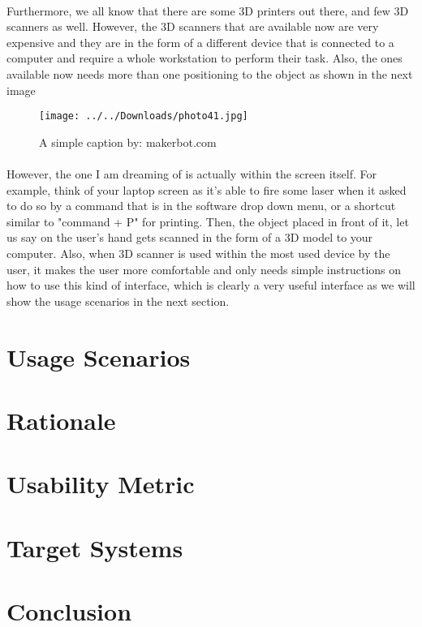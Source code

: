 \documentclass[12pt, oneside]{article}   	%
\begin{document}
\paragraph{}
Furthermore, we all know that there are some 3D printers out there, and few 3D scanners as well.  However, the 3D scanners that are available now are very expensive and they are in the form of a different device that is connected to a computer and require a whole workstation to perform their task.  Also, the ones available now needs more than one positioning to the object as shown in the next image

\begin{figure}[ht!]
\centering
\texttt{[image: ../../Downloads/photo41.jpg]}
\caption{A simple caption by: makerbot.com}
\label{overflow}
\end{figure}

\paragraph{}
  However, the one I am dreaming of is actually within the screen itself.  For example, think of your laptop screen as it's able to fire some laser when it asked to do so by a command that is in the software drop down menu, or a shortcut similar to "command + P" for printing. Then, the object placed in front of it, let us say on the user's hand gets scanned in the form of a 3D model to your computer. Also, when 3D scanner is used within the most used device by the user, it makes the user more comfortable and only needs simple instructions on how to use this kind of interface, which is clearly a very useful interface as we will show the usage scenarios in the next section.
\section{Usage Scenarios}
\paragraph{}
\section{Rationale}
\paragraph{}
\section{Usability Metric}
\paragraph{}
\section{Target Systems}
\paragraph{}
\section{Conclusion}
\paragraph{}
\end{document}
